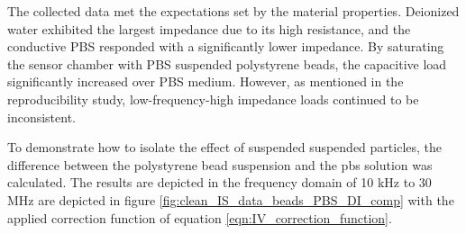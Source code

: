 \par The collected data met the expectations set by the material properties. Deionized water exhibited the largest impedance due to its high resistance, and the conductive PBS responded with a significantly lower impedance. By saturating the sensor chamber with PBS suspended polystyrene beads, the capacitive load significantly increased over PBS medium. However, as mentioned in the reproducibility study, low-frequency-high impedance loads continued to be inconsistent.

\par To demonstrate how to isolate the effect of suspended suspended particles, the difference between the polystyrene bead suspension and the pbs solution was calculated. The results are depicted in the frequency domain of 10 kHz to 30 MHz are depicted in figure \ref{fig:clean_IS_data_beads_PBS_DI_comp} with the applied correction function of equation \ref{eqn:IV_correction_function}.


